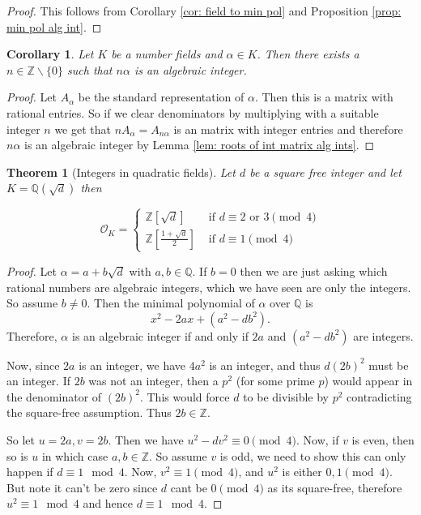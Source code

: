 \documentclass[11pt,a4paper]{report}
\theoremstyle{plain}
\newtheorem{theorem}[subsection]{Theorem}
\newtheorem{corollary}[subsection]{Corollary}
\theoremstyle{definition}
\theoremstyle{definition}
\newcommand{\ZZ}{\mathbb{Z}}
\def\QQ{\mathbb{Q}}
\def \a{\alpha}
\def \OO {\mathcal{O}}
\begin{document}
	
	
	\begin{proof}
		This follows from Corollary \ref{cor: field to min pol} and Proposition \ref{prop: min pol alg int}.
	\end{proof}
	
	\begin{corollary}
		Let $K$ be a number fields and $\a \in K$. Then there exists a $n \in \ZZ\backslash\{0\}$ such that $n \a$ is an algebraic integer.  
	\end{corollary}
	
	\begin{proof}
		Let $A_\a$ be the standard representation of $\a$. Then this is a matrix with rational entries. So if we clear denominators by multiplying with a suitable integer $n$ we get that $n A_\a=A_{n\a}$ is an matrix with integer entries and therefore $n\a$ is an algebraic integer by Lemma \ref{lem: roots of int matrix alg ints}.
	\end{proof}
	
	
	
	\begin{theorem}[Integers in quadratic fields]\label{thm: int quad field} Let $d$ be a square free integer and let $K=\QQ(\sqrt{d})$ then
		
		\[\OO_K= \begin{cases}
			\ZZ[\sqrt{d}] & \text{ if } d\equiv 2 \text{ or } 3 \pmod 4 \\
			\ZZ[\frac{1+\sqrt{d}}{2}] &  \text{ if } d\equiv 1 \pmod 4
		\end{cases}   \]
		
		
		
	\end{theorem}
	
	\begin{proof}
		Let $\a=a+b\sqrt{d}$ with $a,b \in \QQ$. If $b=0$ then we are just asking which rational numbers are algebraic integers, which we have seen are only the integers. So assume $b \neq 0$. Then the minimal polynomial of $\a$ over $\QQ$ is \[x^2-2ax+ (a^2-db^2).\] Therefore, $\a$ is an algebraic integer if and only if $2a$ and  $(a^2-db^2)$ are integers.
		
		
		
		Now, since $2a$ is an integer, we have $4a^2$ is an integer, and thus $d(2b)^2$ must be an integer. If $2b$ was not an integer, then  a $p^2$ (for some prime $p$) would appear in the denominator of $(2b)^2$. This would force $d$ to be divisible by $p^2$ contradicting the square-free assumption. Thus $2b \in \ZZ$.
		
		So let $u=2a,v=2b$. Then we have $u^2-dv^2 \equiv 0 \pmod 4$. Now, if $v$ is even, then so is $u$ in which case $a,b \in \ZZ$. So assume $v$ is odd, we need to show this can only happen if $d \equiv 1 \mod 4$. Now, $v^2 \equiv 1 \pmod 4$, and $u^2$ is either $0,1 \pmod 4$. But note it can't be zero since $d$ cant be $0 \pmod 4$ as its square-free, therefore $u^2 \equiv 1 \mod 4$ and hence $d \equiv 1 \mod 4$.	
	\end{proof}
	
\end{document}
